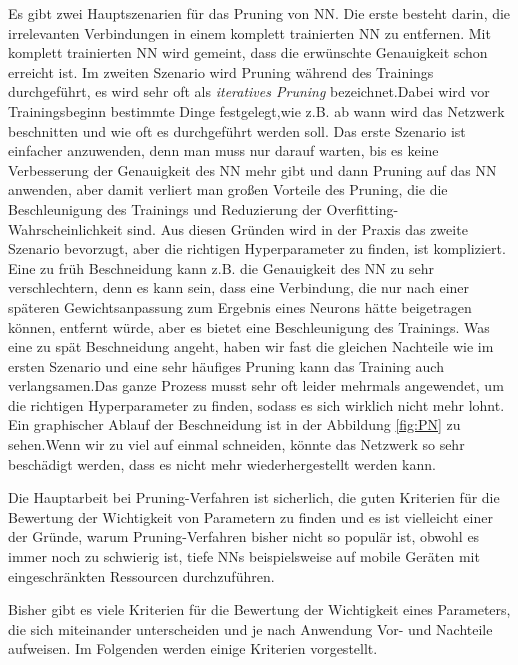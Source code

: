 \documentclass[12pt,a4paper]{scrartcl}
\numberwithin{equation}{section}
\begin{document}
Es gibt zwei Hauptszenarien für das Pruning von \ac{NN}.
Die erste besteht darin, die irrelevanten Verbindungen in einem komplett trainierten \ac{NN} zu entfernen. Mit komplett trainierten \ac{NN} wird gemeint, dass die erwünschte Genauigkeit schon erreicht ist. Im zweiten Szenario wird Pruning während des Trainings durchgeführt, es wird sehr oft als \textit{iteratives Pruning} bezeichnet.Dabei wird vor Trainingsbeginn  bestimmte Dinge festgelegt,wie z.B. ab wann wird das Netzwerk beschnitten und wie oft es durchgeführt werden soll. 
Das erste Szenario ist einfacher anzuwenden, denn man muss nur darauf warten, bis es keine Verbesserung der Genauigkeit des \ac{NN} mehr gibt und dann Pruning auf das \ac{NN} anwenden, aber damit verliert man großen Vorteile des Pruning, die die Beschleunigung des Trainings und Reduzierung der Overfitting-Wahrscheinlichkeit sind.
Aus diesen Gründen wird in der Praxis das zweite Szenario bevorzugt, aber die richtigen Hyperparameter zu finden, ist kompliziert. Eine zu früh Beschneidung kann z.B. die Genauigkeit des \ac{NN} zu sehr verschlechtern, denn es kann sein, dass eine Verbindung, die nur nach einer späteren Gewichtsanpassung zum Ergebnis eines Neurons  hätte beigetragen können, entfernt würde, aber es bietet eine Beschleunigung des Trainings. Was eine zu spät Beschneidung angeht, haben wir fast die gleichen Nachteile wie im ersten Szenario und eine sehr häufiges Pruning kann das Training  auch verlangsamen.Das ganze Prozess musst sehr oft leider mehrmals angewendet, um die richtigen Hyperparameter zu finden, sodass es sich wirklich nicht mehr lohnt. Ein graphischer Ablauf der Beschneidung ist in der Abbildung \ref{fig:PN} zu sehen.Wenn wir zu viel auf einmal schneiden, könnte das Netzwerk so sehr beschädigt werden, dass es nicht mehr wiederhergestellt werden kann.

Die Hauptarbeit bei Pruning-Verfahren ist sicherlich, die guten Kriterien für die Bewertung der Wichtigkeit von Parametern zu finden und es ist vielleicht einer der Gründe, warum Pruning-Verfahren bisher nicht so populär ist, obwohl es immer noch zu schwierig ist, tiefe \acsp{NN} beispielsweise auf  mobile Geräten mit eingeschränkten Ressourcen durchzuführen.

Bisher gibt es viele Kriterien für die Bewertung der Wichtigkeit eines Parameters, die sich miteinander unterscheiden und je nach Anwendung Vor- und Nachteile aufweisen. Im Folgenden werden einige Kriterien vorgestellt.
\end{document}
